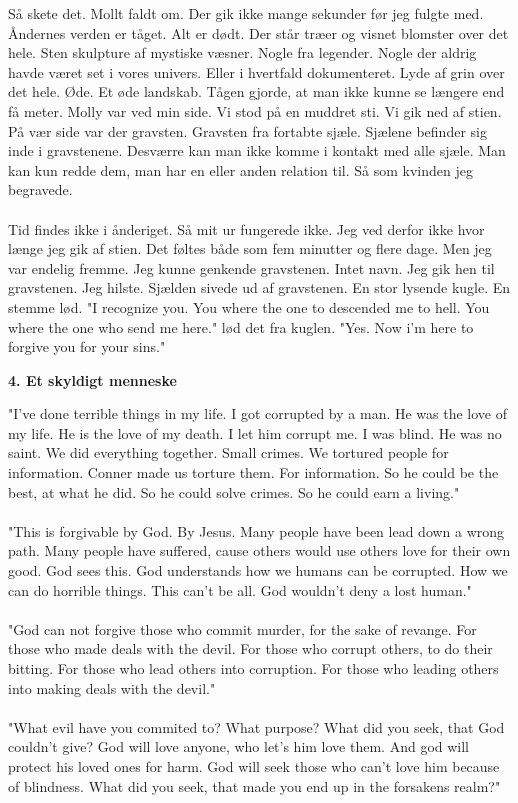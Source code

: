 \documentclass[]{article}
\begin{document}
Så skete det. Mollt faldt om. Der gik ikke mange sekunder før jeg fulgte med. Åndernes verden er tåget. Alt er dødt. Der står træer og visnet blomster over det hele. Sten skulpture af mystiske væsner. Nogle fra legender. Nogle der aldrig havde været set i vores univers. Eller i hvertfald dokumenteret. Lyde af grin over det hele. Øde. Et øde landskab. Tågen gjorde, at man ikke kunne se længere end få meter. Molly var ved min side. Vi stod på en muddret sti. Vi gik ned af stien. På vær side var der gravsten. Gravsten fra fortabte sjæle. Sjælene befinder sig inde i gravstenene. Desværre kan man ikke komme i kontakt med alle sjæle. Man kan kun redde dem, man har en eller anden relation til. Så som kvinden jeg begravede.
\\ \\
Tid findes ikke i ånderiget. Så mit ur fungerede ikke. Jeg ved derfor ikke hvor længe jeg gik af stien. Det føltes både som fem minutter og flere dage. Men jeg var endelig fremme. Jeg kunne genkende gravstenen. Intet navn. Jeg gik hen til gravstenen. Jeg hilste. Sjælden sivede ud af gravstenen. En stor lysende kugle. En stemme lød. "I recognize you. You where the one to descended me to hell. You where the one who send me here." lød det fra kuglen. "Yes. Now i'm here to forgive you for your sins."

\begin{center}
	\large\textbf{4. Et skyldigt menneske}
\end{center}

"I've done terrible things in my life. I got corrupted by a man. He was the love of my life. He is the love of my death. I let him corrupt me. I was blind. He was no saint. We did everything together. Small crimes. We tortured people for information. Conner made us torture them. For information. So he could be the best, at what he did. So he could solve crimes. So he could earn a living."
\\ \\
"This is forgivable by God. By Jesus. Many people have been lead down a wrong path. Many people have suffered, cause others would use others love for their own good. God sees this. God understands how we humans can be corrupted. How we can do horrible things. This can't be all. God wouldn't deny a lost human."
\\ \\
"God can not forgive those who commit murder, for the sake of revange. For those who made deals with the devil. For those who corrupt others, to do their bitting. For those who lead others into corruption. For those who leading others into making deals with the devil."
\\ \\
"What evil have you commited to? What purpose? What did you seek, that God couldn't give? God will love anyone, who let's him love them. And god will protect his loved ones for harm. God will seek those who can't love him because of blindness. What did you seek, that made you end up in the forsakens realm?"
\end{document}
